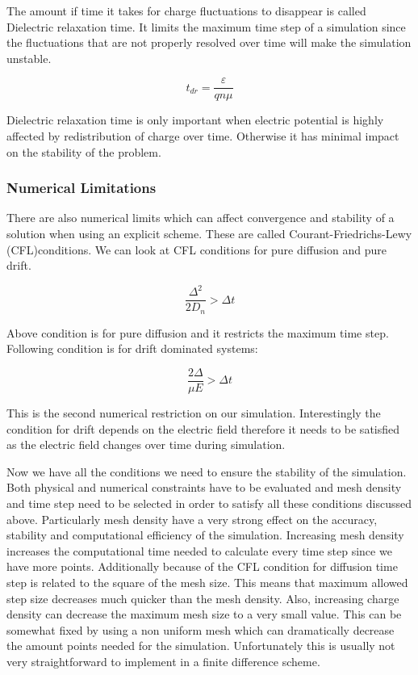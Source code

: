 The amount if time it takes for charge fluctuations to disappear is called Dielectric relaxation time. It limits the maximum time step of a simulation since the fluctuations that are not properly resolved over time will make the simulation unstable.

\begin{equation}
t_{dr}=\frac{\varepsilon}{q n \mu}
\label{tdr}
\end{equation}

Dielectric relaxation time is only important when electric potential is highly affected by redistribution of charge over time. Otherwise it has minimal impact on the stability of the problem.
\subsubsection{Numerical Limitations}

There are also numerical limits which can affect convergence and stability of a solution when using an explicit scheme. These are called Courant-Friedrichs-Lewy (CFL)conditions. We can look at CFL conditions for pure diffusion and pure drift.

\begin{equation}
\frac{\Delta ^2}{2 D_n}>\Delta t
\label{CFL_Diff}
\end{equation}

Above condition is for pure diffusion and it restricts the maximum time step. Following condition is for drift dominated systems:

\begin{equation}
\frac{2 \Delta }{\mu E}>\Delta t
\label{CFL_Drift}
\end{equation}

This is the second numerical restriction on our simulation. Interestingly the condition for drift depends on the electric field therefore it needs to be satisfied as the electric field changes over time during simulation.

Now we have all the conditions we need to ensure the stability of the simulation. Both physical and numerical constraints have to be evaluated and mesh density and time step need to be selected in order to satisfy all these conditions discussed above. Particularly mesh density have a very strong effect on the accuracy, stability and computational efficiency of the simulation. Increasing mesh density increases the computational time needed to calculate every time step since we have more points. Additionally because of the CFL condition for diffusion time step is related to the square of the mesh size. This means that maximum allowed step size decreases much quicker than the mesh density. Also, increasing charge density can decrease the maximum mesh size to a very small value. This can be somewhat fixed by using a non uniform mesh which can dramatically decrease the amount points needed for the simulation. Unfortunately this is usually not very straightforward to implement in a finite difference scheme. 


